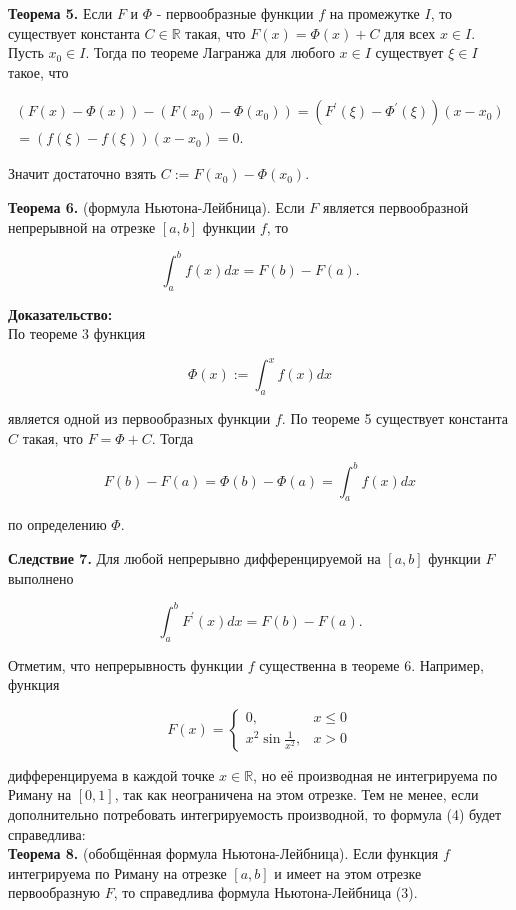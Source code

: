 \documentclass[a4paper,12pt]{article} %
\begin{document}
	\textbf{Теорема 5.} Если $F$ и $\Phi$ - первообразные функции $f$ на промежутке $I$, то существует константа $C \in \mathbb{R}$ такая, что $F(x)=\Phi(x)+C$ для всех $x \in I$. Пусть $x_{0} \in I$. Тогда по теореме Лагранжа для любого $x \in I$ существует $\xi \in I$ такое, что
	
	$$
	\begin{gathered}
	(F(x)-\Phi(x))-\left(F\left(x_{0}\right)-\Phi\left(x_{0}\right)\right)=\left(F^{\prime}(\xi)-\Phi^{\prime}(\xi)\right)\left(x-x_{0}\right) \\
	=(f(\xi)-f(\xi))\left(x-x_{0}\right)=0 .
	\end{gathered}
	$$
	
	Значит достаточно взять $C:=F\left(x_{0}\right)-\Phi\left(x_{0}\right)$.

	\textbf{Теорема 6.} (формула Ньютона-Лейбница). Если $F$ является первообразной непрерывной на отрезке $[a, b]$ функции $f$, то
	
	$$
	\int_{a}^{b} f(x) d x=F(b)-F(a) .
	$$
	
	\textbf{Доказательство:\\}
	По теореме 3 функция
	
	$$
	\Phi(x):=\int_{a}^{x} f(x) d x
	$$
	
	является одной из первообразных функции $f$. По теореме 5 существует константа $C$ такая, что $F=\Phi+C$. Тогда
	
	$$
	F(b)-F(a)=\Phi(b)-\Phi(a)=\int_{a}^{b} f(x) d x
	$$
	
	по определению $\Phi$.


	\textbf{Следствие 7.} Для любой непрерывно дифференцируемой на $[a, b]$ функции $F$ выполнено
	
	$$
	\int_{a}^{b} F^{\prime}(x) d x=F(b)-F(a) .
	$$
	
	Отметим, что непрерывность функции $f$ существенна в теореме 6. Например, функция
	
	$$
	F(x)= \begin{cases}0, & x \leq 0 \\ x^{2} \sin \frac{1}{x^{2}}, & x>0\end{cases}
	$$
	
	дифференцируема в каждой точке $x \in \mathbb{R}$, но её производная не интегрируема по Риману на $[0,1]$, так как неограничена на этом отрезке. Тем не менее, если дополнительно потребовать интегрируемость производной, то формула (4) будет справедлива:\\ \textbf{Теорема 8.} (обобщённая формула Ньютона-Лейбница). Если функция $f$ интегрируема по Риману на отрезке $[a, b]$ и имеет на этом отрезке первообразную $F$, то справедлива формула Ньютона-Лейбница (3).
	
\end{document}
